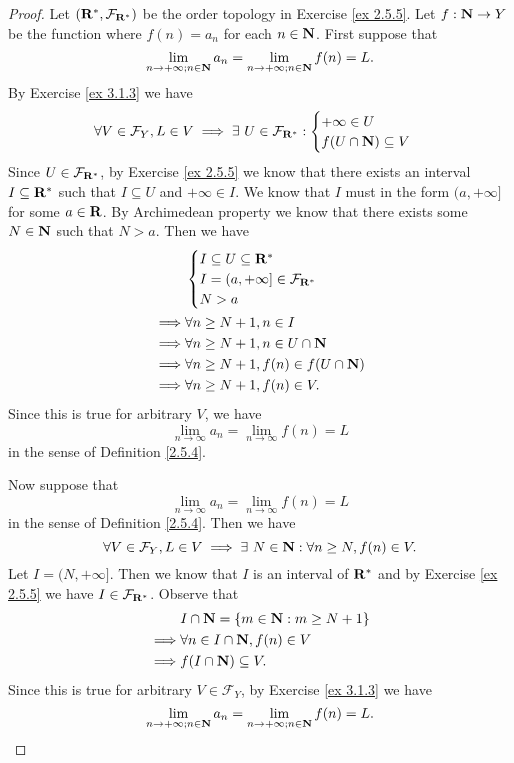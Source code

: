 \begin{proof}
    Let \((\mathbf{R}^*, \mathcal{F}_{\mathbf{R}^*})\) be the order topology in Exercise \ref{ex 2.5.5}.
    Let \(f : \mathbf{N} \to Y\) be the function where \(f(n) = a_n\) for each \(n \in \mathbf{N}\).
    First suppose that
    \[
        \lim_{n \to +\infty ; n \in \mathbf{N}} a_n = \lim_{n \to +\infty ; n \in \mathbf{N}} f(n) = L.
    \]
    By Exercise \ref{ex 3.1.3} we have
    \[
        \forall V \in \mathcal{F}_Y, L \in V \implies \exists\ U \in \mathcal{F}_{\mathbf{R}^*} : \begin{cases}
            +\infty \in U \\
            f(U \cap \mathbf{N}) \subseteq V
        \end{cases}
    \]
    Since \(U \in \mathcal{F}_{\mathbf{R}^*}\), by Exercise \ref{ex 2.5.5} we know that there exists an interval \(I \subseteq \mathbf{R}^*\) such that \(I \subseteq U\) and \(+\infty \in I\).
    We know that \(I\) must in the form \((a, +\infty]\) for some \(a \in \mathbf{R}\).
    By Archimedean property we know that there exists some \(N \in \mathbf{N}\) such that \(N > a\).
    Then we have
    \begin{align*}
                 & \begin{cases}
                       I \subseteq U \subseteq \mathbf{R}^*            \\
                       I = (a, +\infty] \in \mathcal{F}_{\mathbf{R}^*} \\
                       N > a
                   \end{cases}     \\
        \implies & \forall n \geq N + 1, n \in I               \\
        \implies & \forall n \geq N + 1, n \in U \cap \mathbf{N}       \\
        \implies & \forall n \geq N + 1, f(n) \in f(U \cap \mathbf{N}) \\
        \implies & \forall n \geq N + 1, f(n) \in V.
    \end{align*}
    Since this is true for arbitrary \(V\), we have
    \[
        \lim_{n \to \infty} a_n = \lim_{n \to \infty} f(n) = L
    \]
    in the sense of Definition \ref{2.5.4}.

    Now suppose that
    \[
        \lim_{n \to \infty} a_n = \lim_{n \to \infty} f(n) = L
    \]
    in the sense of Definition \ref{2.5.4}.
    Then we have
    \[
        \forall V \in \mathcal{F}_Y, L \in V \implies \exists\ N \in \mathbf{N} : \forall n \geq N, f(n) \in V.
    \]
    Let \(I = (N, +\infty]\).
    Then we know that \(I\) is an interval of \(\mathbf{R}^*\) and by Exercise \ref{ex 2.5.5} we have \(I \in \mathcal{F}_{\mathbf{R}^*}\).
    Observe that
    \begin{align*}
                 & I \cap \mathbf{N} = \{m \in \mathbf{N} : m \geq N + 1\} \\
        \implies & \forall n \in I \cap \mathbf{N}, f(n) \in V     \\
        \implies & f(I \cap \mathbf{N}) \subseteq V.
    \end{align*}
    Since this is true for arbitrary \(V \in \mathcal{F}_Y\), by Exercise \ref{ex 3.1.3} we have
    \[
        \lim_{n \to +\infty ; n \in \mathbf{N}} a_n = \lim_{n \to +\infty ; n \in \mathbf{N}} f(n) = L.
    \]
\end{proof}

